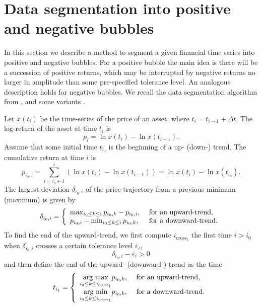 \documentclass[11pt]{amsart}
\theoremstyle{definition}
\theoremstyle{remark}
\numberwithin{equation}{section}
\newcommand{\eps}{\varepsilon}
\begin{document}
\section{Data segmentation into positive and negative bubbles}
\label{sec:data_segmentation}
In this section we describe a method  to segment a given financial time series into positive and negative bubbles.
For a positive bubble the main idea is there will be a  succession of positive
returns, which may be interrupted by negative returns no larger in amplitude than some pre-specified tolerance
level. An analogous description holds for negative bubbles.
We recall the data segmentation algorithm from \cite{gerlach2018dissection},
and some variants \cite{shu2020detection,shu2020real,yamashita2020segmentation}.


Let $x(t_i)$ be the time-series of the  price of an asset, where $t_{i}=t_{i-1}+\Delta t$.
The log-return of the asset at time $t_i$ is \[p_i=\ln x(t_i)-\ln x(t_{i-1}).\]
Assume that some initial time $t_{i_0}$ is the beginning of a up- (down-) trend.
The cumulative return at time $i$ is
\[p_{i_0,i}=\sum_{i=i_0+1}^{i} (\ln x(t_i)-\ln x(t_{i-1}))=\ln x(t_i)-\ln x(t_{i_0}).\]
The largest deviation $\delta_{i_0,i}$ of the price trajectory from a previous minimum (maximum)
is given by
\begin{equation}\delta_{i_0,i}=\left\{
                   \begin{array}{ll}
                     \max_{i_0\leq k\leq i} p_{i_0,k}-p_{i_0,i}, & \hbox{\textrm{ for an upward-trend}}, \\
                     p_{i_0,i}-\min_{i_0\leq k\leq i} p_{i_0,k}, & \hbox{\textrm{ for a  downward-trend}.}
                   \end{array}
                 \right.\label{eqn:delta}\end{equation}
To find the end of the upward-trend, we first compute $i_{\textrm{cross}_1}$ the first time $i>i_0$ when $\delta_{i_0,i}$ crosses a certain tolerance level $\eps_i$,
\begin{equation}\delta_{i_0,i}-\eps_i>0\label{eqn:crossing}\end{equation}
and then define the end of the upward- (downward-) trend as the time
\begin{equation} t_{i_1}=
\left\{
                   \begin{array}{ll}
                     \underset{i_0\leq k\leq i_{\textrm{cross}_ 1}}{\textrm{arg max}}  p_{i_0,k}, & \hbox{\textrm{ for an upward-trend}}, \\[0.5em]
                    \underset{{i_0\leq k\leq i_{\textrm{cross}_1}}}{\textrm{arg min}} p_{i_0,k}, & \hbox{\textrm{ for a  downward-trend}.}
                   \end{array}
                 \right.
\label{eqn:end_time}
\end{equation}
\end{document}
